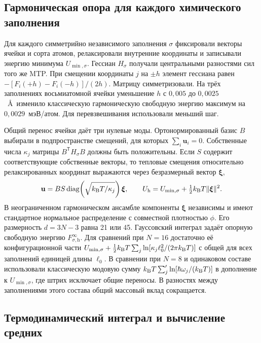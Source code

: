 \documentclass[11pt,a4paper]{article}
\begin{document}
\subsection{Гармоническая опора для каждого химического заполнения}

Для каждого симметрийно независимого заполнения $\sigma$ фиксировали векторы
ячейки и сорта атомов, релаксировали внутренние координаты и записывали
энергию минимума $U_{\min,\sigma}$. Гессиан $H_\sigma$ получали центральными
разностями сил того же MTP. При смещении координаты $j$ на $\pm h$ элемент
гессиана равен $-[F_i(+h)-F_i(-h)]/(2h)$. Матрицу симметризовали. На трёх
заполнениях восьмиатомной ячейки уменьшение $h$ с $0{,}005$ до
$0{,}0025$~\AA\ изменило классическую гармоническую свободную энергию максимум
на $0{,}0029$~мэВ/атом. Для перевзвешивания использовали меньший шаг.

Общий перенос ячейки даёт три нулевые моды. Ортонормированный базис $B$
выбирали в подпространстве смещений, для которых $\sum_i\mathbf u_i=0$.
Собственные числа $\kappa_j$ матрицы $B^{\mathsf T}H_\sigma B$ должны быть
положительны. Если $S$ содержит соответствующие собственные векторы, то
тепловые смещения относительно релаксированных координат выражаются через
безразмерный вектор $\boldsymbol\xi$,
\begin{equation}
 \mathbf u=B S\,\mathrm{diag}\!\left(\sqrt{k_{\rm B}T/\kappa_j}\right)
  \boldsymbol\xi,\qquad
 U_{\mathrm h}=U_{\min,\sigma}+\tfrac12 k_{\rm B}T
                    \lVert\boldsymbol\xi\rVert^2 .
\end{equation}
В неограниченном гармоническом ансамбле компоненты $\boldsymbol\xi$
независимы и имеют стандартное нормальное распределение с совместной
плотностью $\phi$. Его размерность $d=3N-3$ равна 21 или 45. Гауссовский
интеграл задаёт опорную свободную энергию $F_{\sigma,\mathrm h}^{\infty}$.
Для сравнений при $N=16$ достаточно её конфигурационной части
$U_{\min,\sigma}+\tfrac12k_{\rm B}T\sum_j
\ln[\kappa_j\ell_0^2/(2\pi k_{\rm B}T)]$ с общей для всех заполнений единицей
длины $\ell_0$. В сравнении при $N=8$ и одинаковом составе использовали
классическую модовую сумму $k_{\rm B}T\sum'_j\ln[\hbar\omega_j/(k_{\rm B}T)]$
в дополнение к $U_{\min,\sigma}$, где штрих исключает общие переносы.
В разностях между заполнениями этого состава общий массовый вклад сокращается.

\subsection{Термодинамический интеграл и вычисление средних}
\end{document}

